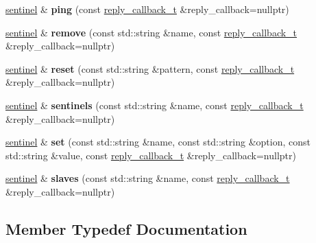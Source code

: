\begin{DoxyCompactItemize}
\hyperlink{classcpp__redis_1_1sentinel}{sentinel} \& {\bfseries ping} (const \hyperlink{classcpp__redis_1_1sentinel_ae1a150ff8787208c47414397a061c9a7}{reply\+\_\+callback\+\_\+t} \&reply\+\_\+callback=nullptr)
\item 
\mbox{\label{classcpp__redis_1_1sentinel_aee344f7f63bc02d13cb9dce08d48d5d9}} 
\hyperlink{classcpp__redis_1_1sentinel}{sentinel} \& {\bfseries remove} (const std\+::string \&name, const \hyperlink{classcpp__redis_1_1sentinel_ae1a150ff8787208c47414397a061c9a7}{reply\+\_\+callback\+\_\+t} \&reply\+\_\+callback=nullptr)
\item 
\mbox{\label{classcpp__redis_1_1sentinel_a11d5f170474aa881df3b6f3cbbde3569}} 
\hyperlink{classcpp__redis_1_1sentinel}{sentinel} \& {\bfseries reset} (const std\+::string \&pattern, const \hyperlink{classcpp__redis_1_1sentinel_ae1a150ff8787208c47414397a061c9a7}{reply\+\_\+callback\+\_\+t} \&reply\+\_\+callback=nullptr)
\item 
\mbox{\label{classcpp__redis_1_1sentinel_a38436712626f27867ecff225eed87a7f}} 
\hyperlink{classcpp__redis_1_1sentinel}{sentinel} \& {\bfseries sentinels} (const std\+::string \&name, const \hyperlink{classcpp__redis_1_1sentinel_ae1a150ff8787208c47414397a061c9a7}{reply\+\_\+callback\+\_\+t} \&reply\+\_\+callback=nullptr)
\item 
\mbox{\label{classcpp__redis_1_1sentinel_a1579c9c9b8ac3cded0a7d70e709e5e1b}} 
\hyperlink{classcpp__redis_1_1sentinel}{sentinel} \& {\bfseries set} (const std\+::string \&name, const std\+::string \&option, const std\+::string \&value, const \hyperlink{classcpp__redis_1_1sentinel_ae1a150ff8787208c47414397a061c9a7}{reply\+\_\+callback\+\_\+t} \&reply\+\_\+callback=nullptr)
\item 
\mbox{\label{classcpp__redis_1_1sentinel_aa4b19659807388d276764f9a79132d00}} 
\hyperlink{classcpp__redis_1_1sentinel}{sentinel} \& {\bfseries slaves} (const std\+::string \&name, const \hyperlink{classcpp__redis_1_1sentinel_ae1a150ff8787208c47414397a061c9a7}{reply\+\_\+callback\+\_\+t} \&reply\+\_\+callback=nullptr)
\end{DoxyCompactItemize}


\subsection{Member Typedef Documentation}
\mbox{\label{classcpp__redis_1_1sentinel_ae1a150ff8787208c47414397a061c9a7}} 
